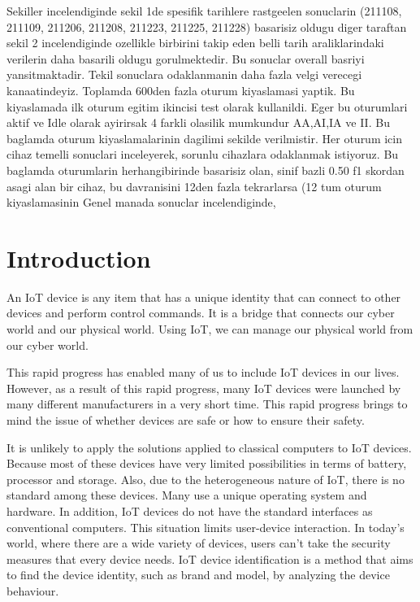 \documentclass[journal]{IEEEtran}
\begin{document}
Sekiller incelendiginde sekil 1de spesifik tarihlere rastgeelen sonuclarin (211108, 211109, 211206, 211208, 211223, 211225, 211228) basarisiz oldugu diger taraftan sekil 2 incelendiginde ozellikle birbirini takip eden belli tarih araliklarindaki verilerin daha basarili oldugu gorulmektedir.
Bu sonuclar overall basriyi yansitmaktadir. Tekil sonuclara odaklanmanin daha fazla velgi verecegi kanaatindeyiz. Toplamda 600den fazla oturum kiyaslamasi yaptik. Bu kiyaslamada ilk oturum egitim ikincisi test olarak kullanildi. Eger bu oturumlari aktif ve Idle olarak ayirirsak 4 farkli olasilik mumkundur AA,AI,IA ve II.  Bu baglamda oturum kiyaslamalarinin dagilimi sekilde verilmistir. Her oturum icin cihaz temelli sonuclari inceleyerek, sorunlu cihazlara odaklanmak istiyoruz. Bu baglamda oturumlarin herhangibirinde basarisiz olan, sinif bazli 0.50 f1 skordan asagi alan bir cihaz, bu davranisini 12den fazla tekrarlarsa (12 tum oturum kiyaslamasinin %
Genel manada sonuclar incelendiginde,






\section{Introduction}














An IoT device is any item that has a unique identity that can connect to other devices and perform control commands\cite{al2015internet}. It is a bridge that connects our cyber world and our physical world\cite{patel2018internet}. Using IoT, we can manage our physical world from our cyber world.

This rapid progress has enabled many of us to include IoT devices in our lives. However, as a result of this rapid progress, many IoT devices were launched by many different manufacturers in a very short time. This rapid progress brings to mind the issue of whether devices are safe or how to ensure their safety.


It is unlikely to apply the solutions applied to classical computers to IoT devices. Because most of these devices have very limited possibilities in terms of battery, processor and storage. Also, due to the heterogeneous nature of IoT, there is no standard among these devices. Many use a unique operating system and hardware. In addition, IoT devices do not have the standard interfaces as conventional computers. This situation limits user-device interaction. In today's world, where there are a wide variety of devices, users can't take the security measures that every device needs. IoT device identification is a method that aims to find the device identity, such as brand and model, by analyzing the device behaviour.
\end{document}
